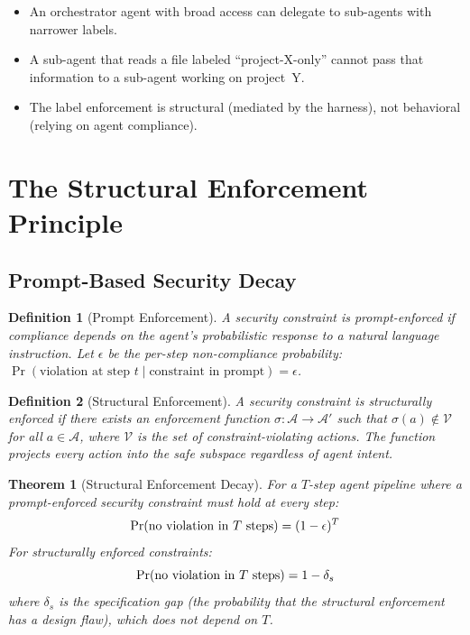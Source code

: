 \documentclass[11pt, a4paper, copyright]{googledeepmind}
\newtheorem{definition}{Definition}[section]
\newtheorem{theorem}{Theorem}[section]
\begin{document}
\begin{itemize}
    \item An orchestrator agent with broad access can delegate to sub-agents with narrower labels.
    \item A sub-agent that reads a file labeled ``project-X-only'' cannot pass that information to a sub-agent working on project~Y.
    \item The label enforcement is structural (mediated by the harness), not behavioral (relying on agent compliance).
\end{itemize}


\section{The Structural Enforcement Principle}
\label{sec:structural}

\subsection{Prompt-Based Security Decay}

\begin{definition}[Prompt Enforcement]
A security constraint is \emph{prompt-enforced} if compliance depends on the agent's probabilistic response to a natural language instruction. Let $\epsilon$ be the per-step non-compliance probability: $\Pr(\text{violation at step } t \mid \text{constraint in prompt}) = \epsilon$.
\end{definition}

\begin{definition}[Structural Enforcement]
A security constraint is \emph{structurally enforced} if there exists an enforcement function $\sigma: \mathcal{A} \to \mathcal{A}'$ such that $\sigma(a) \notin \mathcal{V}$ for all $a \in \mathcal{A}$, where $\mathcal{V}$ is the set of constraint-violating actions. The function projects every action into the safe subspace regardless of agent intent.
\end{definition}

\begin{theorem}[Structural Enforcement Decay]
\label{thm:decay}
For a $T$-step agent pipeline where a prompt-enforced security constraint must hold at every step:
\begin{equation}
\label{eq:decay}
\Pr(\textup{no violation in } T \textup{ steps}) = (1-\epsilon)^T
\end{equation}
For structurally enforced constraints:
\begin{equation}
\Pr(\textup{no violation in } T \textup{ steps}) = 1 - \delta_s
\end{equation}
where $\delta_s$ is the specification gap (the probability that the structural enforcement has a design flaw), which does not depend on $T$.
\end{theorem}
\end{document}
